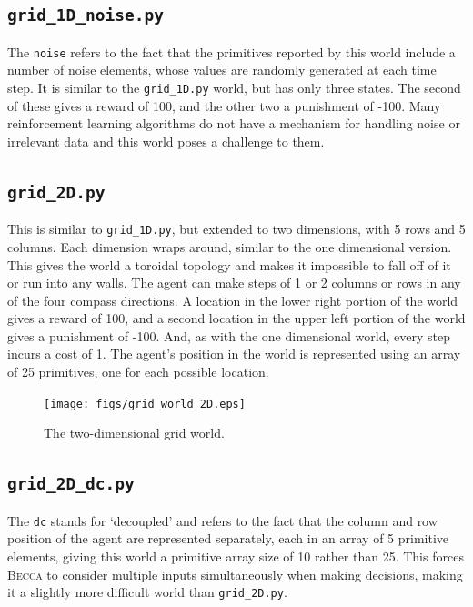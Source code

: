 \subsection{\texttt{grid\_1D\_noise.py}}

The \texttt{noise} refers to the fact that the primitives reported by this world include a number of noise elements, whose values are randomly generated at each time step. It is similar to the  \texttt{grid\_1D.py} world, but has only three states.  The second of these gives a reward of 100, and the other two a punishment of -100. Many reinforcement learning algorithms do not have a mechanism for handling noise or irrelevant data and this world poses a challenge to them. 

\subsection{\texttt{grid\_2D.py}}

This is similar to \texttt{grid\_1D.py}, but extended to two dimensions, with 5 rows and 5 columns. Each dimension wraps around, similar to the one dimensional version. This gives the world a toroidal topology and makes it impossible to fall off of it or run into any walls. The agent can make steps of 1 or 2 columns or rows in any of the four compass directions. A location in the lower right portion of the world gives a reward of 100, and a second location in the upper left portion of the world gives a punishment of -100. And, as with the one dimensional world, every step incurs a cost of 1. The agent's position in the world is represented using an array of 25 primitives, one for each possible location. 

\begin{figure}
\centering
\texttt{[image: figs/grid\_world\_2D.eps]}
\caption{The two-dimensional grid world.}
\label{grid_2D}
\end{figure}

\subsection{\texttt{grid\_2D\_dc.py}}

The \texttt{dc} stands for `decoupled' and refers to the fact that the column and row position of the agent are represented separately, each in an array of 5 primitive elements, giving this world a primitive array size of 10 rather than 25. This forces \textsc{Becca} to consider multiple inputs simultaneously when making decisions, making it a slightly more difficult world than \texttt{grid\_2D.py}.

